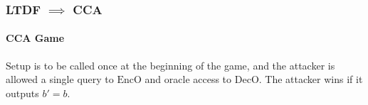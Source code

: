 \documentclass{beamer}
\begin{document}
\begin{frame}
    \frametitle{LTDF $\implies$ CCA}
    \framesubtitle{CCA Game}
    $\mathrm{Setup}$ is to be called once at the beginning of the game, and
    the attacker is allowed a single query to $\mathrm{EncO}$ and oracle access to
    $\mathrm{DecO}$. The attacker wins if it outputs $b' = b$.
    \begin{center}
        \begin{pchstack}
        \end{pchstack}
    \end{center}

\end{frame}
\end{document}
